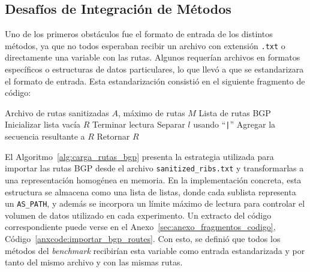 \subsection{Desafíos de Integración de Métodos}

Uno de los primeros obstáculos fue el formato de entrada de los distintos métodos, ya que no todos esperaban recibir un archivo con extensión \texttt{.txt} o directamente una variable con las rutas. Algunos requerían archivos en formatos específicos o estructuras de datos particulares, lo que llevó a que se estandarizara el formato de entrada. Esta estandarización consistió en el siguiente fragmento de código:\\









\begin{algorithm}[H]
\caption{Carga estandarizada de rutas BGP desde archivo}
\label{alg:carga_rutas_bgp}
\begin{algorithmic}[1]
\Require Archivo de rutas sanitizadas $A$, máximo de rutas $M$
\Ensure Lista de rutas BGP
\State Inicializar lista vacía $R$
        \State Terminar lectura
    \EndIf
    \State Separar $l$ usando ``\texttt{|}''
    \State Agregar la secuencia resultante a $R$
\EndFor
\State Retornar $R$
\end{algorithmic}
\end{algorithm}

El Algoritmo~\ref{alg:carga_rutas_bgp} presenta la estrategia utilizada para importar las rutas BGP desde el archivo \texttt{sanitized\_ribs.txt} y transformarlas a una representación homogénea en memoria. 
En la implementación concreta, esta estructura se almacena como una lista de listas, donde cada sublista representa un \texttt{AS\_PATH}, y además se incorpora un límite máximo de lectura para controlar el 
volumen de datos utilizado en cada experimento. Un extracto del código correspondiente puede verse en el Anexo~\ref{sec:anexo_fragmentos_codigo}, Código~\ref{anxcode:importar_bgp_routes}.
Con esto, se definió que todos los métodos del \textit{benchmark} recibirían esta variable como entrada estandarizada y por tanto del mismo archivo y con las mismas rutas.\\

